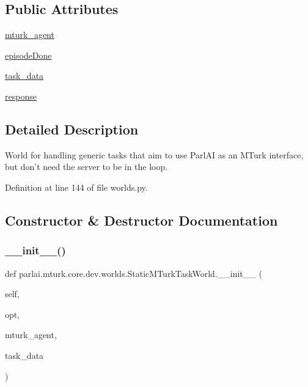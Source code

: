 \subsection*{Public Attributes}
\begin{DoxyCompactItemize}
\item 
\hyperlink{classparlai_1_1mturk_1_1core_1_1dev_1_1worlds_1_1StaticMTurkTaskWorld_aab38e48f7fd04122213d70e5b9c0786c}{mturk\+\_\+agent}
\item 
\hyperlink{classparlai_1_1mturk_1_1core_1_1dev_1_1worlds_1_1StaticMTurkTaskWorld_a9d5943473ba788a5bf6cf6f439d9a2b8}{episode\+Done}
\item 
\hyperlink{classparlai_1_1mturk_1_1core_1_1dev_1_1worlds_1_1StaticMTurkTaskWorld_a18b4236bb2e5867aeb7a6d3c846712ac}{task\+\_\+data}
\item 
\hyperlink{classparlai_1_1mturk_1_1core_1_1dev_1_1worlds_1_1StaticMTurkTaskWorld_ac6d8c12abc3a318337ab68b546631c79}{response}
\end{DoxyCompactItemize}


\subsection{Detailed Description}
\begin{DoxyVerb}World for handling generic tasks that aim to use ParlAI as an MTurk
interface, but don't need the server to be in the loop.
\end{DoxyVerb}
 

Definition at line 144 of file worlds.\+py.



\subsection{Constructor \& Destructor Documentation}
\mbox{\label{classparlai_1_1mturk_1_1core_1_1dev_1_1worlds_1_1StaticMTurkTaskWorld_aaa2fbb9c20a2a3fb4e7bb795ba2391fa}} 
\subsubsection{\texorpdfstring{\+\_\+\+\_\+init\+\_\+\+\_\+()}{\_\_init\_\_()}}
{\footnotesize\ttfamily def parlai.\+mturk.\+core.\+dev.\+worlds.\+Static\+M\+Turk\+Task\+World.\+\_\+\+\_\+init\+\_\+\+\_\+ (\begin{DoxyParamCaption}\item[{}]{self,  }\item[{}]{opt,  }\item[{}]{mturk\+\_\+agent,  }\item[{}]{task\+\_\+data }\end{DoxyParamCaption})}

